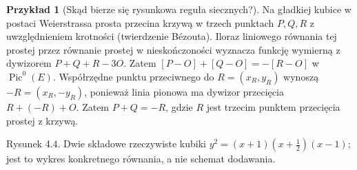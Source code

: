 \documentclass[11pt,a4paper,openany]{report}
\numberwithin{equation}{section}
\theoremstyle{plain}
\theoremstyle{definition}
\newtheorem{przyklad}[twierdzenie]{Przykład}
\theoremstyle{remark}
\begin{document}
\begin{przyklad}[Skąd bierze się rysunkowa reguła siecznych?]
Na gładkiej kubice w postaci Weierstrassa
prosta przecina krzywą w trzech punktach
$P,Q,R$ z uwzględnieniem krotności
(twierdzenie Bézouta). Iloraz liniowego
równania tej prostej przez równanie prostej
w nieskończoności wyznacza funkcję wymierną
z dywizorem $P+Q+R-3O$.
Zatem $[P-O]+[Q-O]=-[R-O]$ w
$\operatorname{Pic}^0(E)$. Współrzędne punktu
przeciwnego do $R=(x_R,y_R)$ wynoszą
$-R=(x_R,-y_R)$, ponieważ linia pionowa ma
dywizor przecięcia $R+(-R)+O$.
Zatem $P+Q=-R$, gdzie $R$ jest trzecim
punktem przecięcia prostej z krzywą.
\end{przyklad}

\begin{center}

{\small Rysunek 4.4. Dwie składowe rzeczywiste kubiki $y^2=(x+1)(x+\tfrac12)(x-1)$; jest to wykres konkretnego równania, a nie schemat dodawania.}\par
\end{center}
\end{document}
